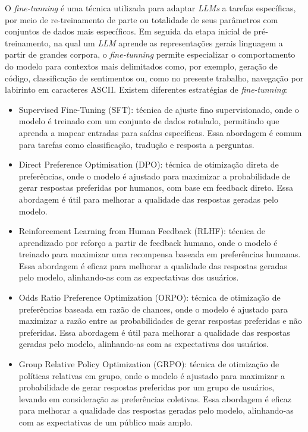 O \textit{fine-tunning} é uma técnica utilizada para adaptar \textit{LLMs} a tarefas específicas, por meio de re-treinamento de parte ou totalidade de seus parâmetros com conjuntos de dados mais específicos. Em seguida da etapa inicial de pré-treinamento, na qual um \textit{LLM} aprende as representações gerais linguagem a partir de grandes corpora, o \textit{fine-tunning} permite especializar o comportamento do modelo para contextos mais delimitados como, por exemplo, geração de código, classificação de sentimentos ou, como no presente trabalho, navegação por labirinto em caracteres ASCII. Existem diferentes estratégias de \textit{fine-tunning}:
\begin{itemize}
    \item Supervised Fine-Tuning (SFT): técnica de ajuste fino supervisionado, onde o modelo é treinado com um conjunto de dados rotulado, permitindo que aprenda a mapear entradas para saídas específicas. Essa abordagem é comum para tarefas como classificação, tradução e resposta a perguntas.
    \item Direct Preference Optimisation (DPO): técnica de otimização direta de preferências, onde o modelo é ajustado para maximizar a probabilidade de gerar respostas preferidas por humanos, com base em feedback direto. Essa abordagem é útil para melhorar a qualidade das respostas geradas pelo modelo.
    \item Reinforcement Learning from Human Feedback (RLHF): técnica de aprendizado por reforço a partir de feedback humano, onde o modelo é treinado para maximizar uma recompensa baseada em preferências humanas. Essa abordagem é eficaz para melhorar a qualidade das respostas geradas pelo modelo, alinhando-as com as expectativas dos usuários.
    \item Odds Ratio Preference Optimization (ORPO): técnica de otimização de preferências baseada em razão de chances, onde o modelo é ajustado para maximizar a razão entre as probabilidades de gerar respostas preferidas e não preferidas. Essa abordagem é útil para melhorar a qualidade das respostas geradas pelo modelo, alinhando-as com as expectativas dos usuários. 
    \item Group Relative Policy Optimization (GRPO): técnica de otimização de políticas relativas em grupo, onde o modelo é ajustado para maximizar a probabilidade de gerar respostas preferidas por um grupo de usuários, levando em consideração as preferências coletivas. Essa abordagem é eficaz para melhorar a qualidade das respostas geradas pelo modelo, alinhando-as com as expectativas de um público mais amplo.
\end{itemize}

